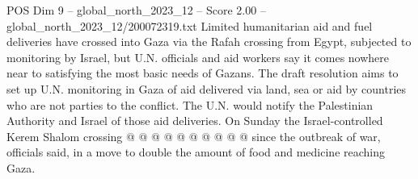 \begin{textsample}{POS Dim 9 – global\_north\_2023\_12 – Score 2.00 – global\_north\_2023\_12/200072319.txt}
Limited humanitarian aid and fuel deliveries have crossed into Gaza via the Rafah crossing from Egypt, subjected to monitoring by Israel, but U.N. officials and aid workers say it comes nowhere near to satisfying the most basic needs of Gazans.
The draft resolution aims to set up U.N. monitoring in Gaza of aid delivered via land, sea or aid by countries who are not parties to the conflict.
The U.N. would notify the Palestinian Authority and Israel of those aid deliveries.
On Sunday the Israel-controlled Kerem Shalom crossing @ @ @ @ @ @ @ @ @ @ since the outbreak of war, officials said, in a move to double the amount of food and medicine reaching Gaza.

\end{textsample}
